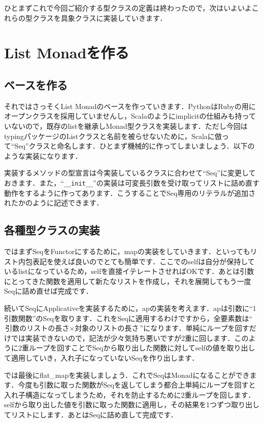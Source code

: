 ひとまずこれで今回ご紹介する型クラスの定義は終わったので，次はいよいよこれらの型クラスを具象クラスに実装していきます．

\section{List Monadを作る}
\subsection{ベースを作る}
それではさっそくList Monadのベースを作っていきます．PythonはRubyの用にオープンクラスを採用していませんし，Scalaのようにimplicitの仕組みも持っていないので，既存のlistを継承しMonad型クラスを実装します．ただし今回はtypingパッケージのListクラスと名前を被らせないために，Scalaに倣って``Seq''クラスと命名します．ひとまず機械的に作ってしまいましょう．以下のような実装になります．


実装するメソッドの型宣言は今実装しているクラスに合わせて``Seq''に変更しておきます．また，``\verb+__init__+''の実装は可変長引数を受け取ってリストに詰め直す動作をするように作ってあります．こうすることでSeq専用のリテラルが追加されたかのように記述できます．

\subsection{各種型クラスの実装}
ではまずSeqをFunctorにするために，mapの実装をしていきます．といってもリスト内包表記を使えば良いのでとても簡単です．ここでのselfは自分が保持しているlistになっているため，selfを直接イテレートさせればOKです．あとは引数にとってきた関数を適用して新たなリストを作成し，それを展開してもう一度Seqに詰め直せば完成です．


続いてSeqにApplicativeを実装するために，apの実装を考えます．apは引数に``1引数関数''のSeqを取ります．これをSeqに適用するわけですから，全要素数は``$\mbox{引数のリストの長さ} \times \mbox{対象のリストの長さ}$''になります．単純にループを回すだけでは実装できないので，記法が少々気持ち悪いですが2重に回します．このように2重ループを回すことでSeqから取り出した関数に対してselfの値を取り出して適用していき，入れ子になっていないSeqを作り出します．


では最後にflat\_mapを実装しましょう．これでSeqはMonadになることができます．今度も引数に取った関数がSeqを返してしまう都合上単純にループを回すと入れ子構造になってしまうため，それを防止するために2重ループを回します．selfから取り出した値を引数に取った関数に適用し，その結果を1つずつ取り出してリストにします．あとはSeqに詰め直して完成です．

